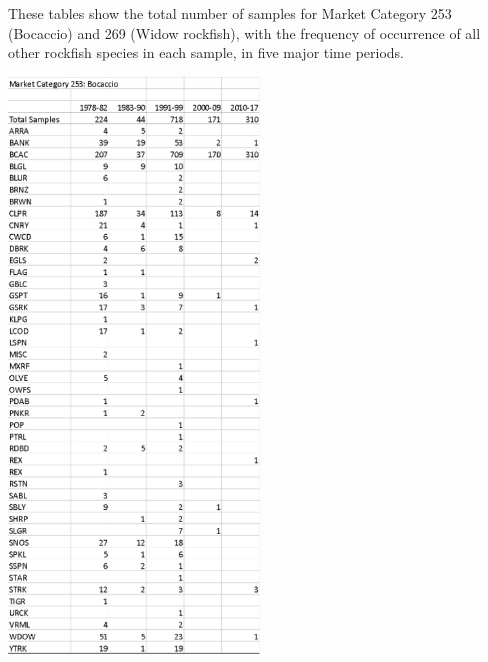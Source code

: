 \documentclass[ xcolor = pdftex, dvipsnames, table ]{beamer}
\begin{document}
%
\begin{frame}
\hspace*{-0.5cm}
\begin{minipage}{0.39\textwidth}
These tables show the total number of samples for Market Category 253 
(Bocaccio) and 269 (Widow rockfish), with the frequency of occurrence of all 
other rockfish species in each sample, in five major time periods.
\end{minipage}
\begin{minipage}{0.59\textwidth}
	\hspace*{0.5cm}
	\includegraphics[width=0.5\textwidth]{./pictures/sampleTable253.pdf}
	\hspace*{0.3cm}

\end{minipage}
\end{frame}
\end{document}
